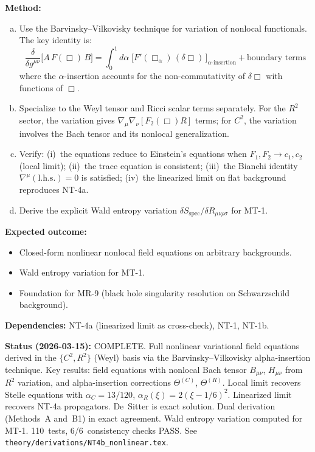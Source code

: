 \documentclass[12pt,a4paper]{article}
\newcommand{\method}[1]{\noindent\textbf{Method:} #1\par}
\newcommand{\outcome}[1]{\noindent\textbf{Expected outcome:} #1\par}
\newcommand{\deps}[1]{\noindent\textbf{Dependencies:} #1\par}
\begin{document}
\method{
\begin{enumerate}[(a)]
  \item Use the Barvinsky--Vilkovisky technique for variation of nonlocal
    functionals. The key identity is:
    \begin{equation}
      \frac{\delta}{\delta g^{\mu\nu}}\bigl[A\,F(\Box)\,B\bigr]
      = \int_0^1 d\alpha\;\bigl[
      F'(\Box_\alpha)\,(\delta\Box)\,\bigr]_{\alpha\text{-insertion}}
      + \text{boundary terms}
    \end{equation}
    where the $\alpha$-insertion accounts for the non-commutativity of
    $\delta\Box$ with functions of $\Box$.
  \item Specialize to the Weyl tensor and Ricci scalar terms separately.
    For the $R^2$ sector, the variation gives
    $\nabla_\mu\nabla_\nu[F_2(\Box)R]$ terms; for $C^2$, the variation
    involves the Bach tensor and its nonlocal generalization.
  \item Verify: (i)~the equations reduce to Einstein's equations when
    $F_1, F_2 \to c_1, c_2$ (local limit); (ii)~the trace equation is
    consistent; (iii)~the Bianchi identity
    $\nabla^\mu(\text{l.h.s.}) = 0$ is satisfied;
    (iv)~the linearized limit on flat background reproduces NT-4a.
  \item Derive the explicit Wald entropy variation
    $\delta S_{\text{spec}}/\delta R_{\mu\nu\rho\sigma}$ for MT-1.
\end{enumerate}
}

\outcome{
\begin{itemize}
  \item Closed-form nonlinear nonlocal field equations on arbitrary backgrounds.
  \item Wald entropy variation for MT-1.
  \item Foundation for MR-9 (black hole singularity resolution on
    Schwarzschild background).
\end{itemize}
}

\deps{NT-4a (linearized limit as cross-check), NT-1, NT-1b.}

\textbf{Status (2026-03-15):} \textcolor{proven}{COMPLETE.}
Full nonlinear variational field equations derived in the $\{C^2, R^2\}$
(Weyl) basis via the Barvinsky--Vilkovisky alpha-insertion technique.
Key results: field equations with nonlocal Bach tensor $B_{\mu\nu}$,
$H_{\mu\nu}$ from $R^2$ variation, and alpha-insertion corrections
$\Theta^{(C)}$, $\Theta^{(R)}$. Local limit recovers Stelle equations
with $\alpha_C = 13/120$, $\alpha_R(\xi) = 2(\xi-1/6)^2$. Linearized
limit recovers NT-4a propagators. De~Sitter is exact solution. Dual
derivation (Methods~A and~B1) in exact agreement. Wald entropy variation
computed for MT-1. 110~tests, 6/6~consistency checks PASS. See
\texttt{theory/derivations/NT4b\_nonlinear.tex}.
\end{document}
